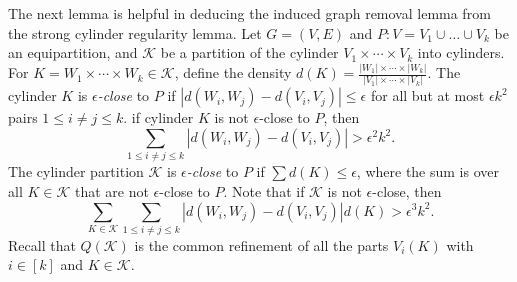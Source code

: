 \documentclass[11pt]{article}
\begin{document}
The next lemma is helpful in deducing the induced graph removal lemma from the strong cylinder regularity lemma. 
Let $G=(V,E)$ and $P:V=V_1 \cup \ldots \cup V_k$ be an equipartition, and
$\mathcal{K}$ be a partition of the cylinder $V_1 \times \cdots \times V_k$
into cylinders. For $K=W_1 \times \cdots \times W_k \in \mathcal{K}$, define
the density $d(K)=\frac{|W_1| \times \cdots \times |W_k|}{|V_1| \times \cdots
\times |V_k|}$. The cylinder $K$ is {\it $\epsilon$-close} to $P$ if
$\left|d(W_i,W_j)-d(V_i,V_j)\right| \leq \epsilon$ for all but at most $\epsilon k^2$ pairs $1 \leq i \not = j \leq k$. if cylinder $K$ is not $\epsilon$-close to $P$, then 
$$\sum_{1 \leq i \not =  j \leq k} \left|d(W_i,W_j)-d(V_i,V_j)\right| > \epsilon^2
k^2.$$
The cylinder partition $\mathcal{K}$ is {\it $\epsilon$-close} to $P$ if  $\sum
d(K) \leq \epsilon$, where the sum is over all $K \in \mathcal{K}$ that are not
$\epsilon$-close to $P$.
Note that if $\mathcal{K}$ is not $\epsilon$-close, then
$$\sum_{K \in \mathcal{K}}\sum_{1 \leq i \not = j \leq k}
\left|d(W_i,W_j)-d(V_i,V_j)\right|d(K) > \epsilon^3 k^2.$$
Recall that $Q(\mathcal{K})$ is the common refinement of all the parts $V_i(K)$ with $i \in [k]$ and $K \in \mathcal{K}$.
\end{document}
